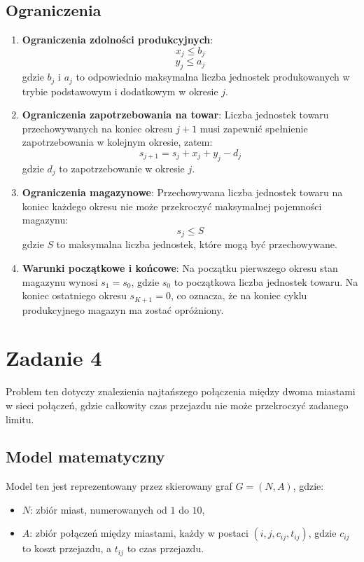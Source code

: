 \documentclass[12pt, letterpaper]{article}
\begin{document}
\subsection*{Ograniczenia}
\begin{enumerate}
  \item \textbf{Ograniczenia zdolności produkcyjnych}:
        \[
          x_j \leq b_j
        \]
        \[
          y_j \leq a_j
        \]
        gdzie \( b_j \) i \( a_j \) to odpowiednio maksymalna liczba jednostek
        produkowanych w trybie podstawowym i dodatkowym w okresie \( j \).

  \item \textbf{Ograniczenia zapotrzebowania na towar}:
        Liczba jednostek towaru przechowywanych na koniec okresu \( j+1 \) musi
        zapewnić spełnienie zapotrzebowania w kolejnym okresie, zatem:
        \[
          s_{j+1} = s_j + x_j + y_j - d_j
        \]
        gdzie \( d_j \) to zapotrzebowanie w okresie \( j \).

  \item \textbf{Ograniczenia magazynowe}:
        Przechowywana liczba jednostek towaru na koniec każdego okresu nie może
        przekroczyć maksymalnej pojemności magazynu:
        \[
          s_j \leq S
        \]
        gdzie \( S \) to maksymalna liczba jednostek, które mogą być
        przechowywane.

  \item \textbf{Warunki początkowe i końcowe}:
        Na początku pierwszego okresu stan magazynu wynosi \( s_1 = s_0 \),
        gdzie \( s_0 \) to początkowa liczba jednostek towaru. Na koniec
        ostatniego
        okresu \( s_{K+1} = 0 \), co oznacza, że na koniec cyklu produkcyjnego
        magazyn
        ma zostać opróżniony.
\end{enumerate}

\section{Zadanie 4}
Problem ten dotyczy znalezienia najtańszego połączenia między dwoma miastami w
sieci połączeń, gdzie całkowity czas przejazdu nie może przekroczyć zadanego
limitu.

\subsection*{Model matematyczny}
Model ten jest reprezentowany przez skierowany graf \( G = (N, A) \), gdzie:
\begin{itemize}
  \item \( N \): zbiór miast, numerowanych od \( 1 \) do \( 10 \),
  \item \( A \): zbiór połączeń między miastami, każdy w postaci \( (i, j,
        c_{ij}, t_{ij}) \), gdzie \( c_{ij} \) to koszt przejazdu, a \( t_{ij}
        \) to
        czas przejazdu.
\end{itemize}
\end{document}
